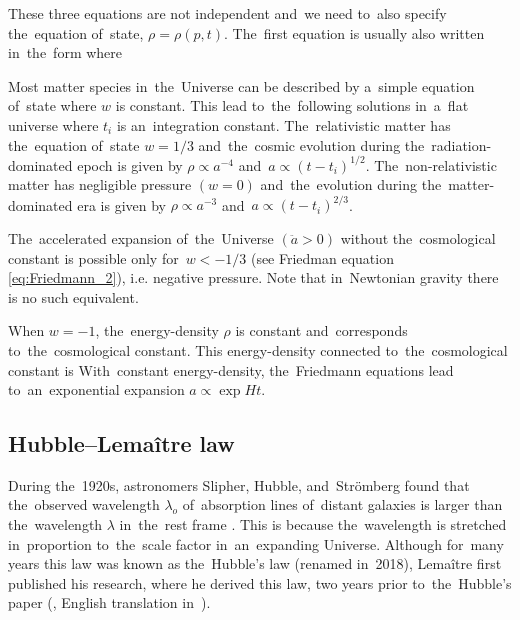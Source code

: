These three equations are not independent and~we need to~also specify the~equation of~state, $\rho=\rho(p,t)$. The~first equation is usually also written in~the~form
where

Most matter species in~the~Universe can be described by a~simple equation of~state
where $w$ is constant. This lead to~the~following solutions in~a~flat universe
where $t_i$ is an~integration constant. The~relativistic matter has the~equation of~state $w=1/3$ and~the~cosmic evolution during the~radiation-dominated epoch is given by $\rho\propto a^{-4}$ and~$a\propto(t-t_i)^{1/2}$. The~non-relativistic matter has negligible pressure $(w=0)$ and~the~evolution during the~matter-dominated era is given by $\rho\propto a^{-3}$ and~$a\propto(t-t_i)^{2/3}$.

The~accelerated expansion of~the~Universe $(\ddot a>0)$ without the~cosmological constant is possible only for~$w<-1/3$ (see Friedman equation \eqref{eq:Friedmann_2}), i.e. negative pressure. Note that in~Newtonian gravity there is no such equivalent.
\DIFdelbegin {}\DIFdelend 

When $w=-1$, the~energy-density $\rho$ is constant and~corresponds to~the~cosmological constant. This energy-density connected to~the~cosmological constant is
With~constant energy-density, the~Friedmann equations lead to~an~exponential expansion $a\propto\exp{Ht}$.

\subsection{Hubble--Lema\^{i}tre law}
During the~1920s, astronomers Slipher, Hubble, and~Str{\"o}mberg found that the~observed wavelength $\lambda_o$ of~absorption lines of~distant galaxies is larger than the~wavelength $\lambda$ in~the~rest frame \parencite{1925ApJ....61..353S,1929PNAS...15..168H}. This is because the~wavelength is stretched in~proportion to~the~scale factor in~an~expanding Universe. Although for~many years this law was known as the~Hubble's law (renamed in~2018), Lema\^{i}tre first published his research, where he derived this law, two years prior to~the~Hubble's paper (\textcite{1927ASSB...47...49L}, English translation in~\textcite{1931MNRAS..91..483L}).

